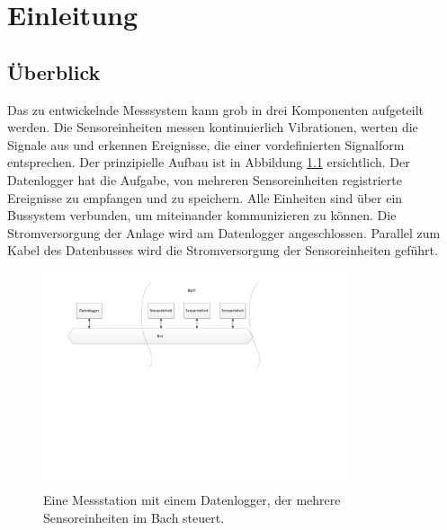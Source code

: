%
%

\chapter{Einleitung}\label{chap.einleitung}



\section{Überblick}\label{sec.ueberblick}
Das zu entwickelnde Messsystem kann grob in drei Komponenten aufgeteilt werden. Die Sensoreinheiten messen kontinuierlich Vibrationen, werten die Signale aus und erkennen Ereignisse, die einer vordefinierten Signalform entsprechen. Der prinzipielle Aufbau ist in Abbildung \ref{fig.situationskroki} ersichtlich. Der Datenlogger hat die Aufgabe, von mehreren Sensoreinheiten registrierte Ereignisse zu empfangen und zu speichern. Alle Einheiten sind über ein Bussystem verbunden, um miteinander kommunizieren zu können. Die Stromversorgung der Anlage wird am Datenlogger angeschlossen. Parallel zum Kabel des Datenbusses wird die Stromversorgung der Sensoreinheiten geführt.

\begin{figure}[H]
	\centering
		\includegraphics[width=0.8\textwidth]{images/visio/situationskroki.pdf}
	\caption{Eine Messstation mit einem Datenlogger, der mehrere Sensoreinheiten im Bach steuert.}
	\label{fig.situationskroki}
\end{figure}

